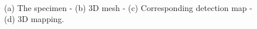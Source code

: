 \graphicspath{ {./Figure/Figure10/}}
\begin{figure}
  \centering
	
  \hspace*{\fill}
  \hfill
	\hspace*{\fill} \\ \hspace*{\fill}
   \hfill
  \hspace*{\fill}
	
	\caption{(a) The specimen - (b) 3D mesh - (c) Corresponding detection map - (d) 3D mapping.}
  \label{fig:8}
\end{figure}

